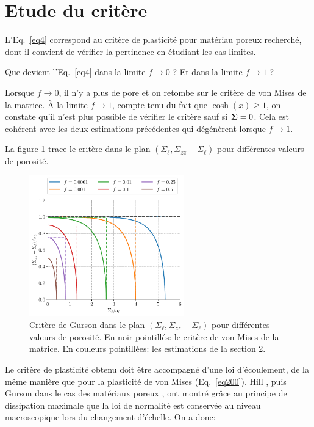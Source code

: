 \documentclass[french,12pt]{exam}
\begin{document}
\section{Etude du critère}
L'Eq.~\eqref{eq4} correspond au critère de plasticité pour matériau poreux recherché, dont il convient de vérifier la pertinence en étudiant les cas limites.\\

\begin{questions}
\question Que devient l'Eq.~\eqref{eq4} dans la limite $f \to 0$ ? Et dans la limite $f \to 1$ ?
\begin{solution}
Lorsque $f\to 0$, il n'y a plus de pore et on retombe sur le critère de von Mises de la matrice. \`A la limite $f\to 1$, compte-tenu du fait que $\cosh(x)\geq 1$, on constate qu'il n'est plus possible de vérifier le critère sauf si $\boldsymbol{\Sigma}=0$.
Cela est cohérent avec les deux estimations précédentes qui dégénèrent lorsque $f\to 1$.
\end{solution}

La figure \ref{fig:Gurson_crit} trace le critère dans le plan $(\Sigma_\ell, \Sigma_{zz} - \Sigma_\ell)$ pour différentes valeurs de porosité.

\begin{figure}
\begin{center}
\includegraphics[width=0.6\textwidth]{Gurson_cylinder}
\end{center}
\caption{Critère de Gurson dans le plan $(\Sigma_\ell, \Sigma_{zz} - \Sigma_\ell)$ pour différentes valeurs de porosité. En noir pointillés: le critère de von Mises de la matrice. En couleurs pointillées: les estimations de la section 2.}
\label{fig:Gurson_crit}
\end{figure}

Le critère de plasticité obtenu doit être accompagné d'une loi d'écoulement, de la même manière que pour la plasticité de von Mises (Eq.~\ref{eq200}). Hill \cite{hill}, puis Gurson dans le cas des matériaux poreux \cite{gurson}, ont montré grâce au principe de dissipation maximale que la loi de normalité est conservée au niveau macroscopique lors du changement d'échelle. On a donc:


\end{questions}
\end{document}
